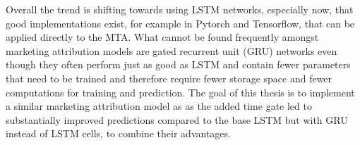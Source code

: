 Overall the trend is shifting towards using LSTM networks, especially now, that good implementations exist, for example in Pytorch and Tensorflow, that can be applied directly to the MTA. 
What cannot be found frequently amongst marketing attribution models are gated recurrent unit (GRU) networks even though they often perform just as good as LSTM and contain fewer parameters that need to be trained and therefore require fewer storage space and fewer computations for training and prediction.
The goal of this thesis is to implement a similar marketing attribution model as \cite{yang-2020} as the added time gate led to substantially improved predictions compared to the base LSTM but with GRU instead of LSTM cells, to combine their advantages.